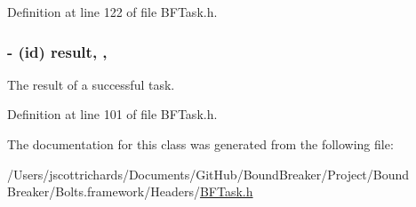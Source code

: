 Definition at line 122 of file B\+F\+Task.\+h.

\hypertarget{interface_b_f_task_a4b748e2af91631b135ca3e324a9fac2e}{}
\subsubsection[{result}]{\setlength{\rightskip}{0pt plus 5cm}-\/ (id) result\hspace{0.3cm}{\ttfamily [read]}, {\ttfamily [nonatomic]}, {\ttfamily [strong]}}\label{interface_b_f_task_a4b748e2af91631b135ca3e324a9fac2e}
The result of a successful task. 

Definition at line 101 of file B\+F\+Task.\+h.



The documentation for this class was generated from the following file\+:\begin{DoxyCompactItemize}
\item 
/\+Users/jscottrichards/\+Documents/\+Git\+Hub/\+Bound\+Breaker/\+Project/\+Bound Breaker/\+Bolts.\+framework/\+Headers/\hyperlink{_b_f_task_8h}{B\+F\+Task.\+h}\end{DoxyCompactItemize}
